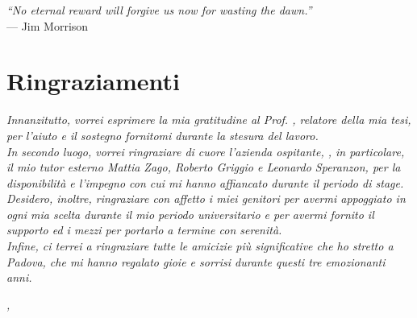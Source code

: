 
\cleardoublepage
{}
{}

\begin{flushright}{
	\slshape    
	``No eternal reward will forgive us now for wasting the dawn.''} \\ 
	\medskip
    --- Jim Morrison
\end{flushright}


\bigskip

\begingroup
\let\clearpage\relax
\let\cleardoublepage\relax
\let\cleardoublepage\relax

\chapter*{Ringraziamenti}

\noindent \textit{Innanzitutto, vorrei esprimere la mia gratitudine al Prof. \myProf, relatore della mia tesi, per l'aiuto e il sostegno fornitomi durante la stesura del lavoro.}\\
\noindent \textit{In secondo luogo, vorrei ringraziare di cuore l'azienda ospitante, \myAzienda, in particolare, il mio tutor esterno Mattia Zago, Roberto Griggio e Leonardo Speranzon, per la disponibilità e l'impegno con cui mi hanno affiancato durante il periodo di stage.}\\

\noindent \textit{Desidero, inoltre, ringraziare con affetto i miei genitori per avermi appoggiato in ogni mia scelta durante il mio periodo universitario e per avermi fornito il supporto ed i mezzi per portarlo a termine con serenità.}\\

\noindent \textit{Infine, ci terrei a ringraziare tutte le amicizie più significative che ho stretto a Padova, che mi hanno regalato gioie e sorrisi durante questi tre emozionanti anni.}\\
\bigskip

\noindent\textit{\myLocation, \myTime}
\hfill \myName

\endgroup

